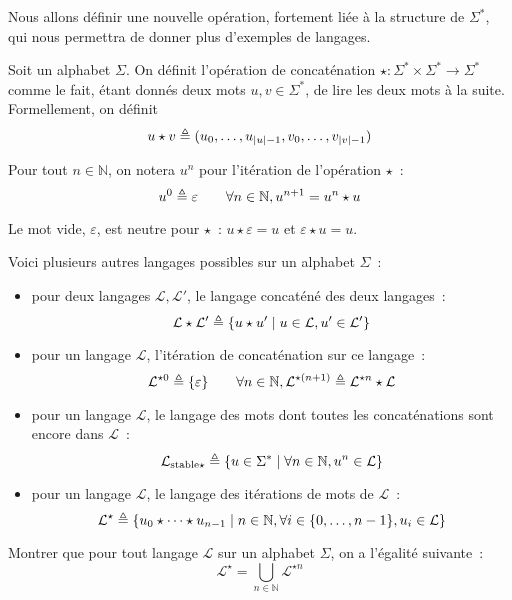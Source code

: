 Nous allons définir une nouvelle opération, fortement liée à la structure de
$\Sigma^*$, qui nous permettra de donner plus d'exemples de langages.

\begin{definition}[Concaténation]
  Soit un alphabet $\Sigma$. On définit l'opération de concaténation
  $\star : \Sigma^*\times\Sigma^*\to\Sigma^*$ comme le fait, étant donnés deux
  mots $u,v\in\Sigma^*$, de lire les deux mots à la suite. Formellement, on
  définit
  \[u\star v \triangleq (u_0,\ldots,u_{|u|-1},v_0,\ldots,v_{|v|-1})\]

  Pour tout $n\in \mathbb N$, on notera $u^n$ pour l'itération de l'opération
  $\star$~:
  \[u^0 \triangleq \varepsilon \qquad
  \forall n \in \mathbb N, u^{n+1} = u^n \star u\]
\end{definition}

\begin{remark}
  Le mot vide, $\varepsilon$, est neutre pour $\star$~: $u\star\varepsilon = u$
  et $\varepsilon \star u = u$.
\end{remark}

\begin{example}
  Voici plusieurs autres langages possibles sur un alphabet $\Sigma$~:
  \begin{itemize}
  \item pour deux langages $\mathcal L, \mathcal L'$, le langage concaténé des
    deux langages~:
    \[\mathcal L\star\mathcal L'\triangleq
    \{u\star u'\mid u \in \mathcal L, u' \in \mathcal L' \}\]
  \item pour un langage $\mathcal L$, l'itération de concaténation sur ce
    langage~:
    \[\mathcal L^{\star 0} \triangleq \{\varepsilon\}\qquad
    \forall n \in \mathbb N, \mathcal L^{\star(n+1)} \triangleq
    \mathcal L^{\star n}\star\mathcal L\]
  \item pour un langage $\mathcal L$, le langage des mots dont toutes les
    concaténations sont encore dans $\mathcal L$~:
    \[\mathcal L_{\mathrm{stable}\star}\triangleq
    \{u\in \Sigma^*\mid \forall n \in \mathbb N, u^n \in \mathcal L\}\]
  \item pour un langage $\mathcal L$, le langage des itérations de mots de
    $\mathcal L$~:
    \[\mathcal L^\star \triangleq
    \{u_0\star\cdots\star u_{n-1}\mid
    n \in \mathbb N, \forall i\in \{0,\ldots,n -1\}, u_i \in \mathcal L\}\]
  \end{itemize}
\end{example}

\begin{exercise}
  Montrer que pour tout langage $\mathcal L$ sur un alphabet $\Sigma$, on a
  l'égalité suivante~:
  \[\mathcal L^\star = \bigcup_{n \in \mathbb N} \mathcal L^{\star n}\]
\end{exercise}

